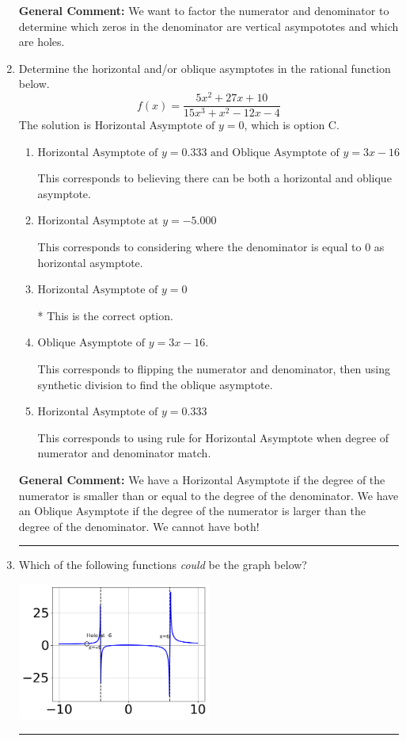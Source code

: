 \documentclass{extbook}[14pt]
\newcommand{\litem}[1]{\item #1

\rule{\textwidth}{0.4pt}}
\begin{document}
\begin{enumerate}
{\textbf{General Comment:} We want to factor the numerator and denominator to determine which zeros in the denominator are vertical asympototes and which are holes.
}
\litem{
Determine the horizontal and/or oblique asymptotes in the rational function below.
\[ f(x) = \frac{5x^{2} +27 x + 10}{15x^{3} + x^{2} -12 x -4} \]The solution is \( \text{Horizontal Asymptote of } y = 0 \), which is option C.\begin{enumerate}[label=\Alph*.]
\item \( \text{Horizontal Asymptote of } y = 0.333 \text{ and Oblique Asymptote of } y = 3x -16 \)

This corresponds to believing there can be both a horizontal and oblique asymptote.
\item \( \text{Horizontal Asymptote at } y = -5.000 \)

This corresponds to considering where the denominator is equal to 0 as horizontal asymptote.
\item \( \text{Horizontal Asymptote of } y = 0 \)

* This is the correct option.
\item \( \text{Oblique Asymptote of } y = 3x -16. \)

This corresponds to flipping the numerator and denominator, then using synthetic division to find the oblique asymptote.
\item \( \text{Horizontal Asymptote of } y = 0.333  \)

This corresponds to using rule for Horizontal Asymptote when degree of numerator and denominator match.
\end{enumerate}

\textbf{General Comment:} We have a Horizontal Asymptote if the degree of the numerator is smaller than or equal to the degree of the denominator. We have an Oblique Asymptote if the degree of the numerator is larger than the degree of the denominator. We cannot have both!
}
\litem{
Which of the following functions \textit{could} be the graph below?

\begin{center}
    \includegraphics[width=0.5\textwidth]{../Figures/identifyGraphOfRationalFunctionC.png}
\end{center}


}
\end{enumerate}
\end{document}
